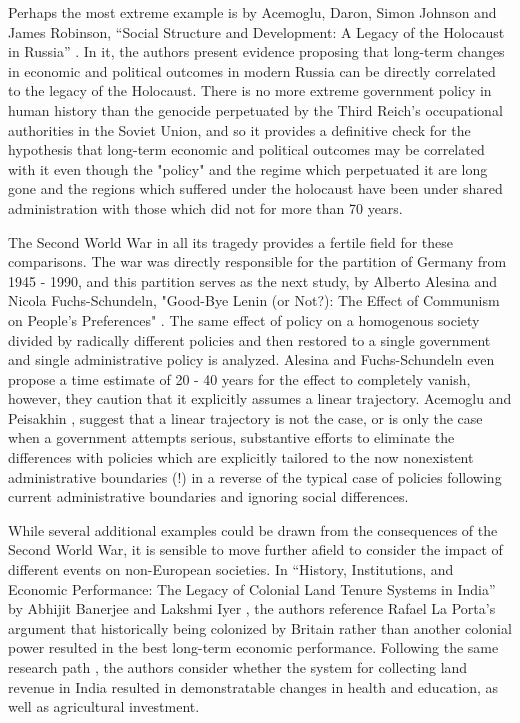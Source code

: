 Perhaps the most extreme example is by Acemoglu, Daron, Simon Johnson and James Robinson, ``Social Structure and Development: A Legacy of the Holocaust in Russia'' \cite{acemoglu11}.  In it, the authors present evidence proposing that long-term changes in economic and political outcomes in modern Russia can be directly correlated to the legacy of the Holocaust. There is no more extreme government policy in human history than the genocide perpetuated by the Third Reich's occupational authorities in the Soviet Union, and so it provides a definitive check for the hypothesis that long-term economic and political outcomes may be correlated with it even though the "policy" and the regime which perpetuated it are long gone and the regions which suffered under the holocaust have been under shared administration with those which did not for more than 70 years. %

The Second World War in all its tragedy provides a fertile field for these comparisons. The war was directly responsible for the partition of Germany from 1945 - 1990, and this partition serves as the next study, by Alberto Alesina and Nicola Fuchs-Schundeln, "Good-Bye Lenin (or Not?): The Effect of Communism on People's Preferences" \cite{alesina07}. The same effect of policy on a homogenous society divided by radically different policies and then restored to a single government and single administrative policy is analyzed. Alesina and Fuchs-Schundeln even propose a time estimate of 20 - 40 years for the effect to completely vanish, however, they caution that it explicitly assumes a linear trajectory. Acemoglu and Peisakhin \cite{peisakhin13}, \cite{acemoglu11} suggest that a linear trajectory is not the case, or is only the case when a government attempts serious, substantive efforts to eliminate the differences with policies which are explicitly tailored to the now nonexistent administrative boundaries (!) in a reverse of the typical case of policies following current administrative boundaries and ignoring social differences.  %

While several additional examples could be drawn from the consequences of the Second World War, it is sensible to move further afield to consider the impact of different events on non-European societies. In ``History, Institutions, and Economic Performance: The Legacy of Colonial Land Tenure Systems in India'' by Abhijit Banerjee and Lakshmi Iyer \cite{banerjee05}, the authors reference Rafael La Porta's argument that historically being colonized by Britain rather than another colonial power resulted in the best long-term economic performance. Following the same research path \cite{banerjee05}, the authors consider whether the system for collecting land revenue in India resulted in demonstratable changes in health and education, as well as agricultural investment.

